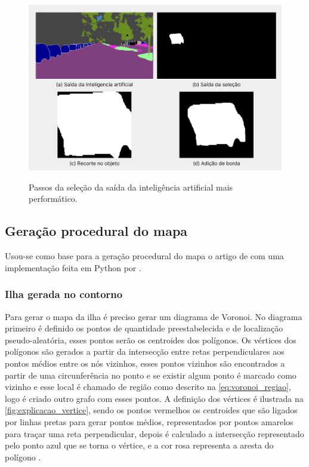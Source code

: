 \begin{figure}[!ht]
	\centering
    \caption{Passos da seleção da saída da inteligência  artificial mais performático.}
	\includegraphics[width=1.0\textwidth]{figures/saidas_selecao_2.png}
	\label{fig:saidas_selecao_perf}
\end{figure}

\subsection{Geração procedural do mapa}

Usou-se como base para a geração procedural do mapa o artigo de  com uma implementação feita em Python por .

\subsubsection{Ilha gerada no contorno}

Para gerar o mapa da ilha é preciso gerar um diagrama de Voronoi. No diagrama primeiro é definido os pontos de quantidade preestabelecida e de localização pseudo-aleatória, esses pontos serão os centroides dos polígonos. Os vértices dos polígonos são gerados a partir da intersecção entre retas perpendiculares aos pontos médios entre os nós vizinhos, esses pontos vizinhos são encontrados a partir de uma circunferência no ponto e se existir algum ponto é marcado como vizinho e esse local é chamado de região como descrito na \cref{eq:voronoi_regiao}, logo é criado outro grafo com esses pontos. A definição dos vértices é ilustrada na \cref{fig:explicacao_vertice}, sendo os pontos vermelhos os centroides que são ligados por linhas pretas para gerar pontos médios, representados por pontos amarelos para traçar uma reta perpendicular, depois é calculado a intersecção representado pelo ponto azul que se torna o vértice, e a cor rosa representa a aresta do polígono \cite{amitp2010,rodrigues_diagrama_2019}.

